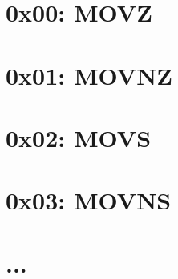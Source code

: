 \documentclass[oneside, a4paper]{memoir}
\begin{document}
\section*{0x00: MOVZ}
\section*{0x01: MOVNZ}
\section*{0x02: MOVS}
\section*{0x03: MOVNS}
\section*{...}

\appendix
\end{document}
